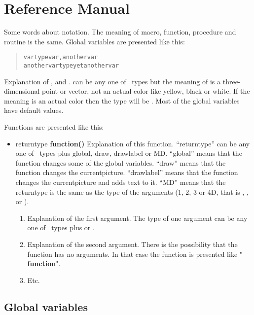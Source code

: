 \section{Reference Manual}

Some words about notation.
The meaning of macro, function, procedure and routine is the same.
Global variables are presented like this:
\begin{quote}
\begin{alltt}
vartype var, anothervar
anothervartype yetanothervar
\end{alltt}
\end{quote}
Explanation of ,  and
.  can be any one of
\MP\ types but the meaning
of  is a three-dimensional point or vector, not an
actual color like yellow, black or white. If the meaning is
an actual color then the type will be .
Most of the global variables have default values.

Functions are presented like this:
\begin{itemize}
\item returntype {\bfseries function()}
Explanation of this function. ``returntype'' can be any one of \MP\
types plus global, draw,  drawlabel or MD.
``global'' means that the function
changes some of the global variables. ``draw'' means that
the function
changes the currentpicture. ``drawlabel'' means that the
function changes
the currentpicture and adds text to it. ``MD'' means that the
returntype is the same as the type of the arguments (1, 2, 3 or 4D,
that is \myem{numeric}, \myem{pair}, \myem{color} or ).
\begin{enumerate}
\item  {}
Explanation of the first argument. The type of
one argument can be any one
of \MP\ types plus  or
.
\item  {}
Explanation of the second argument.
There is the possibility that the
function has no arguments. In that case the
function is presented like
" {\bfseries function}".
\item  Etc.
\end{enumerate}
\end{itemize}

\subsection{Global variables}

